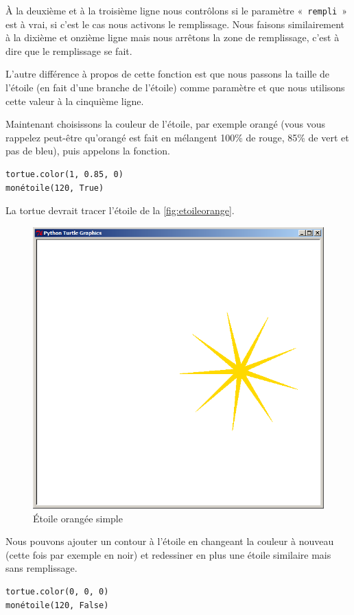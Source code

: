 À la deuxième et à la troisième ligne nous contrôlons si le paramètre « \texttt{rempli} » est à vrai, si c'est le cas nous activons le remplissage. Nous faisons similairement à la dixième et onzième ligne mais nous arrêtons la zone de remplissage, c'est à dire que le remplissage se fait.

L'autre différence à propos de cette fonction est que nous passons la taille de l'étoile (en fait d'une branche de l'étoile) comme paramètre et que nous utilisons cette valeur à la cinquième ligne.

Maintenant choisissons la couleur de l'étoile, par exemple orangé (vous vous rappelez peut-être qu'orangé est fait en mélangent 100\% de rouge, 85\% de vert et pas de bleu), puis appelons la fonction.

\begin{Verbatim}[frame=single,rulecolor=\color{mbleu}, label=à taper]
tortue.color(1, 0.85, 0)
monétoile(120, True)
\end{Verbatim}

La tortue devrait tracer l'étoile de la \autoref{fig:etoileorange}.
\begin{figure}[h!]
\centering
\includegraphics[scale=0.4]{images/etoileorange}
\caption{Étoile orangée simple}\label{fig:etoileorange}
\end{figure}

Nous pouvons ajouter un contour à l'étoile en changeant la couleur à nouveau (cette fois par exemple en noir) et redessiner en plus une étoile similaire mais sans remplissage.
\begin{Verbatim}[frame=single,rulecolor=\color{mbleu}, label=à taper]
tortue.color(0, 0, 0)
monétoile(120, False)
\end{Verbatim}

